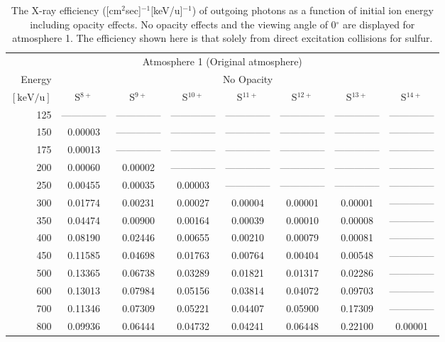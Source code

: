 \begin{table}[ht]
    \centering
    \caption{The X-ray efficiency ([cm$^2$sec]$^{-1}$[keV/u]$^{-1}$) of outgoing photons as a function of initial ion energy including opacity effects. No opacity effects and the viewing angle of 0$^\circ$ are displayed for atmosphere 1. The efficiency shown here is that solely from direct excitation collisions for sulfur.}
    \begin{tabular}{r|c|c|c|c|c|c|c}
    \multicolumn{8}{c}{Atmosphere 1 (Original atmosphere)} \\ \cline{2-8}
    Energy & \multicolumn{7}{c}{No Opacity} \\ \cline{2-8}
    $\mathrm{[keV/u]}$ & S$^{8+}$ & S$^{9+}$ & S$^{10+}$ & S$^{11+}$ & S$^{12+}$ & S$^{13+}$ & S$^{14+}$ \\ \cline{1-8}
      125 & -------------- & -------------- & -------------- & -------------- & -------------- & -------------- & -------------- \\ 
      150 & 0.00003 & -------------- & -------------- & -------------- & -------------- & -------------- & -------------- \\
      175 & 0.00013 & -------------- & -------------- & -------------- & -------------- & -------------- & -------------- \\
      200 & 0.00060 & 0.00002 & -------------- & -------------- & -------------- & -------------- & -------------- \\
      250 & 0.00455 & 0.00035 & 0.00003 & -------------- & -------------- & -------------- & -------------- \\
      300 & 0.01774 & 0.00231 & 0.00027 & 0.00004 & 0.00001 & 0.00001 & -------------- \\
      350 & 0.04474 & 0.00900 & 0.00164 & 0.00039 & 0.00010 & 0.00008 & -------------- \\
      400 & 0.08190 & 0.02446 & 0.00655 & 0.00210 & 0.00079 & 0.00081 & -------------- \\
      450 & 0.11585 & 0.04698 & 0.01763 & 0.00764 & 0.00404 & 0.00548 & -------------- \\
      500 & 0.13365 & 0.06738 & 0.03289 & 0.01821 & 0.01317 & 0.02286 & -------------- \\
      600 & 0.13013 & 0.07984 & 0.05156 & 0.03814 & 0.04072 & 0.09703 & -------------- \\
      700 & 0.11346 & 0.07309 & 0.05221 & 0.04407 & 0.05900 & 0.17309 & -------------- \\
      800 & 0.09936 & 0.06444 & 0.04732 & 0.04241 & 0.06448 & 0.22100 & 0.00001 \\

\end{tabular}
\end{table}
